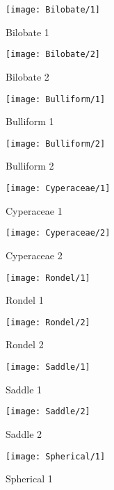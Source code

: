 \begin{figure}
	\centering
	\begin{subfigure}[b]{0.2\textwidth}
        \texttt{[image: Bilobate/1]}
        \caption{Bilobate 1}
    \end{subfigure}
    \begin{subfigure}[b]{0.2\textwidth}
        \texttt{[image: Bilobate/2]}
        \caption{Bilobate 2}
    \end{subfigure}
    \begin{subfigure}[b]{0.2\textwidth}
        \texttt{[image: Bulliform/1]}
        \caption{Bulliform 1}
    \end{subfigure}
    \begin{subfigure}[b]{0.2\textwidth}
        \texttt{[image: Bulliform/2]}
        \caption{Bulliform 2}
	\end{subfigure}
    \begin{subfigure}[b]{0.2\textwidth}
        \texttt{[image: Cyperaceae/1]}
        \caption{Cyperaceae 1}
    \end{subfigure}
    \begin{subfigure}[b]{0.2\textwidth}
        \texttt{[image: Cyperaceae/2]}
        \caption{Cyperaceae 2}
    \end{subfigure}
    \begin{subfigure}[b]{0.2\textwidth}
        \texttt{[image: Rondel/1]}
        \caption{Rondel 1}
    \end{subfigure}
    \begin{subfigure}[b]{0.2\textwidth}
        \texttt{[image: Rondel/2]}
        \caption{Rondel 2}
    \end{subfigure}
    \begin{subfigure}[b]{0.2\textwidth}
        \texttt{[image: Saddle/1]}
        \caption{Saddle 1}
    \end{subfigure}
    \begin{subfigure}[b]{0.2\textwidth}
        \texttt{[image: Saddle/2]}
        \caption{Saddle 2}
    \end{subfigure}
    \begin{subfigure}[b]{0.2\textwidth}
        \texttt{[image: Spherical/1]}
        \caption{Spherical 1}
    \end{subfigure}
    \begin{subfigure}[b]{0.2\textwidth}

\end{subfigure}
\end{figure}
